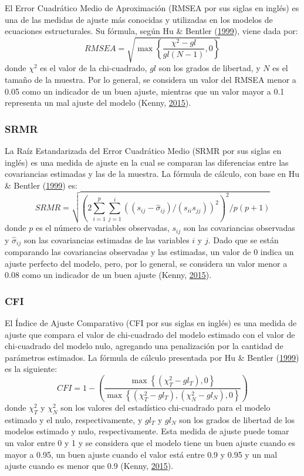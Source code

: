 \documentclass[
  english]{revcoles}
\begin{document}
El Error Cuadrático Medio de Aproximación (RMSEA por sus siglas en
inglés) es una de las medidas de ajuste más conocidas y utilizadas en
los modelos de ecuaciones estructurales. Su fórmula, según Hu \& Bentler
(\protect\hyperlink{ref-Hu1999}{1999}), viene dada por: \[
  RMSEA = \sqrt{\max\left\{\frac{\chi^2 - gl}{gl (N-1)} , 0 \right\}}
\] donde \(\chi^2\) es el valor de la chi-cuadrado, \(gl\) son los
grados de libertad, y \(N\) es el tamaño de la muestra. Por lo general,
se considera un valor del RMSEA menor a 0.05 como un indicador de un
buen ajuste, mientras que un valor mayor a 0.1 representa un mal ajuste
del modelo (Kenny, \protect\hyperlink{ref-Kenny2015}{2015}).

\subsubsection{SRMR}

La Raíz Estandarizada del Error Cuadrático Medio (SRMR por sus siglas en
inglés) es una medida de ajuste en la cual se comparan las diferencias
entre las covariancias estimadas y las de la muestra. La fórmula de
cálculo, con base en Hu \& Bentler
(\protect\hyperlink{ref-Hu1999}{1999}) es: \[
  SRMR = \sqrt{\left(2 \sum\limits_{i=1}^p \sum\limits_{j=1}^i \left((s_{ij} - \hat\sigma_{ij}) / (s_{ii} s_{jj}) \right)^2 \right)^2 / p(p+1)}
\] donde \(p\) es el número de variables observadas, \(s_{ij}\) son las
covariancias observadas y \(\hat\sigma_{ij}\) son las covariancias
estimadas de las variables \(i\) y \(j\). Dado que se están comparando
las covariancias observadas y las estimadas, un valor de 0 indica un
ajuste perfecto del modelo, pero, por lo general, se considera un valor
menor a 0.08 como un indicador de un buen ajuste (Kenny,
\protect\hyperlink{ref-Kenny2015}{2015}).

\subsubsection{CFI}

El Índice de Ajuste Comparativo (CFI por sus siglas en inglés) es una
medida de ajuste que compara el valor de chi-cuadrado del modelo
estimado con el valor de chi-cuadrado del modelo nulo, agregando una
penalización por la cantidad de parámetros estimados. La fórmula de
cálculo presentada por Hu \& Bentler
(\protect\hyperlink{ref-Hu1999}{1999}) es la siguiente: \[
  CFI = 1 - \left( \frac{\max \left\{(\chi^2_T - gl_T), 0  \right\}}{\max \left\{(\chi^2_T - gl_T), (\chi^2_N - gl_N), 0 \right\}} \right)
\] donde \(\chi^2_T\) y \(\chi^2_N\) son los valores del estadístico
chi-cuadrado para el modelo estimado y el nulo, respectivamente, y
\(gl_T\) y \(gl_N\) son los grados de libertad de los modelos estimado y
nulo, respectivamente. Esta medida de ajuste puede tomar un valor entre
0 y 1 y se considera que el modelo tiene un buen ajuste cuando es mayor
a 0.95, un buen ajuste cuando el valor está entre 0.9 y 0.95 y un mal
ajuste cuando es menor que 0.9 (Kenny,
\protect\hyperlink{ref-Kenny2015}{2015}).
\end{document}

